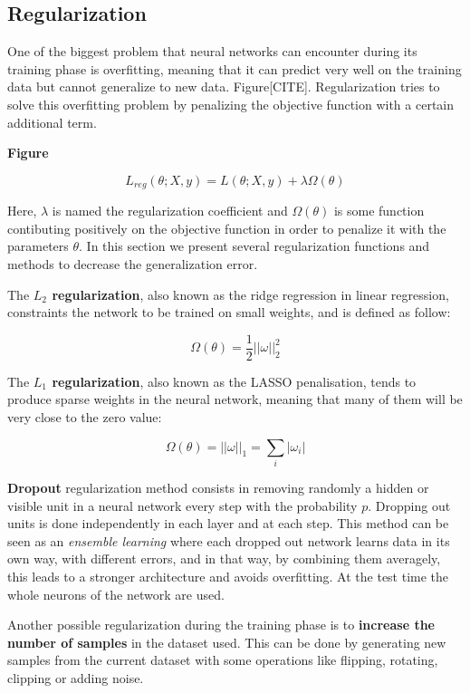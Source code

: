 \documentclass[master,final,11pt]{iscs-thesis}
\begin{document}
\subsection{Regularization}

One of the biggest problem that neural networks can encounter during its training phase is overfitting, meaning that it can predict very well on the training data but cannot generalize to new data. Figure[CITE]. Regularization tries to solve this overfitting problem by penalizing the objective function with a certain additional term.

\textbf{ Figure}

\[
L_{reg}(\theta; X, y) = L(\theta; X, y) + \lambda \Omega(\theta)
\]

Here, $\lambda$ is named the regularization coefficient and $\Omega(\theta)$ is some function contibuting positively on the objective function in order to penalize it with the parameters $\theta$. In this section we present several regularization functions and methods to decrease the generalization error.

The \textbf{$L_2$ regularization}, also known as the ridge regression in linear regression, constraints the network to be trained on small weights, and is defined as follow:

\[
\Omega(\theta)= \frac{1}{2}|| \omega ||^2_2
\]

The \textbf{$L_1$ regularization}, also known as the LASSO penalisation, tends to produce sparse weights in the neural network, meaning that many of them will be very close to the zero value:

\[
\Omega(\theta)= || \omega ||_1=\sum_i|\omega_i|
\]

\textbf{Dropout} \cite{DO} regularization method consists in removing randomly a hidden or visible unit in a neural network every step with the probability $p$. Dropping out units is done independently in each layer and at each step. This method can be seen as an \textit{ensemble learning} where each dropped out network learns data in its own way, with different errors, and in that way, by combining them averagely, this leads to a stronger architecture and avoids overfitting. At the test time the whole neurons of the network are used.

Another possible regularization during the training phase is to \textbf{increase the number of samples} in the dataset used. This can be done by generating new samples from the current dataset with some operations like flipping, rotating, clipping or adding noise.
\end{document}

